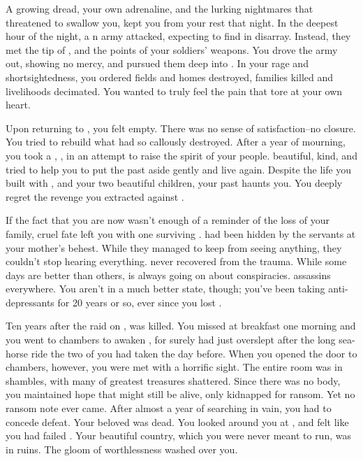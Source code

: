 \documentclass[char]{NeptuneBall}
\begin{document}
A growing dread, your own adrenaline, and the lurking nightmares that threatened to swallow you, kept you from your rest that night. In the deepest hour of the night, a \pPacifica{}n army attacked, expecting to find \pAtlantis{} in disarray. Instead, they met the tip of \iTrident{\MYname{}}, and the points of your soldiers' weapons. You drove the army out, showing no mercy, and pursued them deep into \pPacifica{}. In your rage and shortsightedness, you ordered fields and homes destroyed, families killed and livelihoods decimated. You wanted \pPacifica{} to truly feel the pain that tore at your own heart.

Upon returning to \pAtlantis{}, you felt empty. There was no sense of satisfaction--no closure. You tried to rebuild what \pPacifica{} had so callously destroyed. After a year of mourning, you took a \cQueen{\spouse{}}, \cQueen{\King{}} \cQueen{}, in an attempt to raise the spirit of your people. \cQueen{\They{}} \cQueen{\were} beautiful, kind, and tried to help you to put the past aside gently and live again. Despite the life you built with \cQueen{}, and your two beautiful children, your past haunts you. You deeply regret the revenge you extracted against \pPacifica{}. 

If the fact that you are now \cKing{\King} wasn't enough of a reminder of the loss of your family, cruel fate left you with one surviving \cPlant{\sibling}. \cPlant{} had been hidden by the servants at your mother's behest.  While they managed to keep \cPlant{\them} from seeing anything, they couldn't stop \cPlant{\them} hearing everything. \cPlant{} never recovered from the trauma.  While some days are better than others, \cPlant{} is always going on about conspiracies. \cPlant{\They}  assassins everywhere.  You aren't in a much better state, though; you've been taking anti-depressants for 20 years or so, ever since you lost \cQueen{}. 

Ten years after the raid on \pPacifica{}, \cQueen{} was killed. You missed \cQueen{\them} at breakfast one morning and you went to \cQueen{\their} chambers to awaken \cQueen{\them}, for surely \cQueen{\they} had just overslept after the long sea-horse ride the two of you had taken the day before. When you opened the door to \cQueen{\their} chambers, however, you were met with a horrific sight. The entire room was in shambles, with many of \cQueen{\their} greatest treasures shattered. Since there was no body, you maintained hope that \cQueen{\they} might still be alive, only kidnapped for ransom. Yet no ransom note ever came. After almost a year of searching in vain, you had to concede defeat. Your beloved \cQueen{} was dead. You looked around you at \pAtlantis{}, and felt like you had failed \cQueen{\them}. Your beautiful country, which you were never meant to run, was in ruins. The gloom of worthlessness washed over you.
\end{document}
